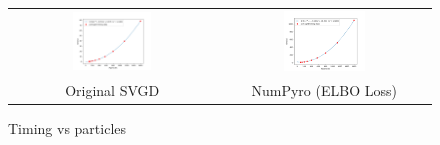 \begin{figure}[!htbp]
    \centering
    \begin{tabular}{@{}cc@{}}
            \includegraphics[width=0.40\textwidth]{figs/toy-timing-particles.png} & \includegraphics[width=0.40\textwidth]{figs/toy-timing-particles-numpyro-elbo.png}\\
        \small Original SVGD & NumPyro (ELBO Loss) \\
    \end{tabular}
    \caption{Timing vs particles }
    \label{fig:timingparticles}
\end{figure}
